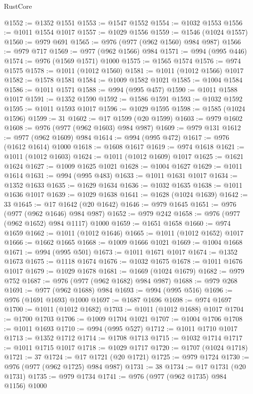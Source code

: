 \begin{lexlean}{RustCore}
\begin{coremodule}
@1552 := @1352 @1551
@1553 := @1547 @1552
@1554 := @1032 @1553
@1556 := @1011 @1554 @1017
@1557 := @1029 @1556
@1559 := @1546 (@1024 @1557)
@1560 := @979 @691
@1565 := @976 (@977 (@962 @1560) @984 @987)
@1566 := @979 @717
@1569 := @977 (@962 @1566) @984
@1571 := @994 (@995 @446)
@1574 := @976 (@1569 @1571) @1000
@1575 := @1565 @1574
@1576 := @974 @1575
@1578 := @1011 (@1012 @1560)
@1581 := @1011 (@1012 @1566) @1017
@1582 := @1578 @1581
@1584 := @1009 @1582 @1021
@1585 := @1004 @1584
@1586 := @1011 @1571
@1588 := @994 (@995 @457)
@1590 := @1011 @1588 @1017
@1591 := @1352 @1590
@1592 := @1586 @1591
@1593 := @1032 @1592
@1595 := @1011 @1593 @1017
@1596 := @1029 @1595
@1598 := @1585 (@1024 @1596)
@1599 := 31
@1602 := @17 @1599 (@20 @1599)
@1603 := @979 @1602
@1608 := @976 (@977 (@962 @1603) @984 @987)
@1609 := @979 @131
@1612 := @977 (@962 @1609) @984
@1614 := @994 (@995 @472)
@1617 := @976 (@1612 @1614) @1000
@1618 := @1608 @1617
@1619 := @974 @1618
@1621 := @1011 (@1012 @1603)
@1624 := @1011 (@1012 @1609) @1017
@1625 := @1621 @1624
@1627 := @1009 @1625 @1021
@1628 := @1004 @1627
@1629 := @1011 @1614
@1631 := @994 (@995 @483)
@1633 := @1011 @1631 @1017
@1634 := @1352 @1633
@1635 := @1629 @1634
@1636 := @1032 @1635
@1638 := @1011 @1636 @1017
@1639 := @1029 @1638
@1641 := @1628 (@1024 @1639)
@1642 := 33
@1645 := @17 @1642 (@20 @1642)
@1646 := @979 @1645
@1651 := @976 (@977 (@962 @1646) @984 @987)
@1652 := @979 @242
@1658 := @976 (@977 (@962 @1652) @984 @1117) @1000
@1659 := @1651 @1658
@1660 := @974 @1659
@1662 := @1011 (@1012 @1646)
@1665 := @1011 (@1012 @1652) @1017
@1666 := @1662 @1665
@1668 := @1009 @1666 @1021
@1669 := @1004 @1668
@1671 := @994 (@995 @501)
@1673 := @1011 @1671 @1017
@1674 := @1352 @1673
@1675 := @1118 @1674
@1676 := @1032 @1675
@1678 := @1011 @1676 @1017
@1679 := @1029 @1678
@1681 := @1669 (@1024 @1679)
@1682 := @979 @752
@1687 := @976 (@977 (@962 @1682) @984 @987)
@1688 := @979 @268
@1691 := @977 (@962 @1688) @984
@1693 := @994 (@995 @516)
@1696 := @976 (@1691 @1693) @1000
@1697 := @1687 @1696
@1698 := @974 @1697
@1700 := @1011 (@1012 @1682)
@1703 := @1011 (@1012 @1688) @1017
@1704 := @1700 @1703
@1706 := @1009 @1704 @1021
@1707 := @1004 @1706
@1708 := @1011 @1693
@1710 := @994 (@995 @527)
@1712 := @1011 @1710 @1017
@1713 := @1352 @1712
@1714 := @1708 @1713
@1715 := @1032 @1714
@1717 := @1011 @1715 @1017
@1718 := @1029 @1717
@1720 := @1707 (@1024 @1718)
@1721 := 37
@1724 := @17 @1721 (@20 @1721)
@1725 := @979 @1724
@1730 := @976 (@977 (@962 @1725) @984 @987)
@1731 := 38
@1734 := @17 @1731 (@20 @1731)
@1735 := @979 @1734
@1741 := @976 (@977 (@962 @1735) @984 @1156) @1000

\end{coremodule}
\end{lexlean}

